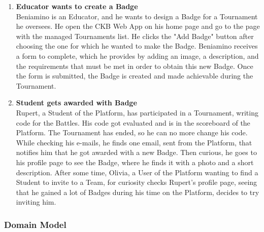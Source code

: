 \begin{enumerate}[label= \textbf{SC\arabic*}]
    \item \textbf{Educator wants to create a Badge} \label{sc:sc13} \\Beniamino is an Educator, and he wants to design a Badge for a Tournament he oversees. He open the CKB Web App on his home page and go to the page with the managed Tournaments list.
    He clicks the "Add Badge" button after choosing the one for which he wanted to make the Badge. Beniamino receives a form to complete, which he provides by adding an image, a description, and the requirements that must be met in order 
    to obtain this new Badge. Once the form is submitted, the Badge is created and made achievable during the Tournament.
    \item \textbf{Student gets awarded with Badge} \label{sc:sc14} \\
    Rupert, a Student of the Platform, has participated in a Tournament, writing code for the Battles. His code got evaluated and is in the scoreboard of the Platform. The Tournament has ended, so he can no more change his code. 
    While checking his e-mails, he finds one email, sent from the Platform, that notifies him that he got awarded with a new Badge.
    Then curious, he goes to his profile page to see the Badge, where he finds it with a photo and a short description.
    After some time, Olivia, a User of the Platform wanting to find a Student to invite to a Team, for curiosity checks Rupert's profile page, seeing that he gained a lot of Badges during his time on the Platform, decides to try inviting him.
\end{enumerate}

\newpage

\subsubsection{Domain Model}

